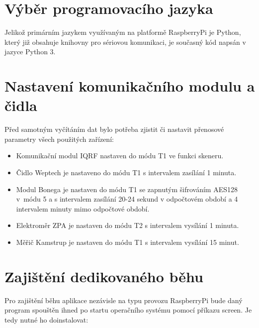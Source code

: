 \section{Výběr programovacího jazyka}
Jelikož primárním jazykem využívaným na platformě RaspberryPi je Python, který již obsahuje knihovny pro sériovou komunikaci, je současný kód napsán v jazyce Python 3.


\section{Nastavení komunikačního modulu a čidla}

Před samotným vyčítáním dat bylo potřeba zjistit či nastavit přenosové parametry všech použitých zařízení:

\begin{itemize}
	\item Komunikační modul IQRF nastaven do módu T1 ve funkci skeneru.
	\item Čidlo Weptech je nastaveno do módu T1 s intervalem zasílání 1 minuta. 
	\item Modul Bonega je nastaven do módu T1 se zapnutým šifrováním AES128 v~módu 5 a s intervalem zasílání 20-24 sekund v odpočtovém období a 4 intervalem minuty mimo odpočtové období.
	\item Elektroměr ZPA je nastaven do módu T2 s intervalem vysílání 1 minuta.
	\item Měřič Kamstrup je nastaven do módu T1 s intervalem vysílání 15 minut.
\end{itemize}


\section{Zajištění dedikovaného běhu}
Pro zajištění běhu aplikace nezávisle na typu provozu RaspberryPi bude daný program spouštěn ihned po startu operačního systému pomocí příkazu screen. Je tedy nutné ho doinstalovat:
 
